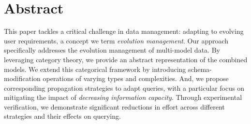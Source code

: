 



% 




\section*{Abstract}

This paper tackles a critical challenge in data management: adapting to evolving user requirements, a concept we term \textit{evolution management}. Our approach specifically addresses the evolution management of multi-model data. By leveraging category theory, we provide an abstract representation of the combined models. We extend this categorical framework by introducing schema-modification operations of varying types and complexities. And, we propose corresponding propagation strategies to adapt queries, with a particular focus on mitigating the impact of \textit{decreasing information capacity}. Through experimental verification, we demonstrate significant reductions in effort across different strategies and their effects on querying.

